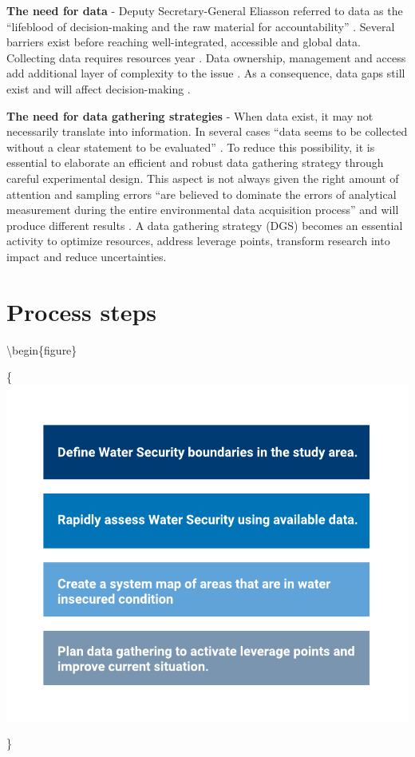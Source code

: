 \documentclass[
]{book}
\begin{document}
\textbf{The need for data} - Deputy Secretary-General Eliasson referred to data as the ``lifeblood of decision-making and the raw material for accountability'' \citep{UNWater2016}. Several barriers exist before reaching well-integrated, accessible and global data. Collecting data requires resources year \citep{Espey2015}. Data ownership, management and access add additional layer of complexity to the issue \citep{Hering2017}. As a consequence, data gaps still exist \citep{Schmidt-Traub2017b, UNwater2019} and will affect decision-making \citep{York2020Measuring}.

\textbf{The need for data gathering strategies} - When data exist, it may not necessarily translate into information. In several cases ``data seems to be collected without a clear statement to be evaluated'' \citep{Rose1992}. To reduce this possibility, it is essential to elaborate an efficient and robust data gathering strategy through careful experimental design. This aspect is not always given the right amount of attention and sampling errors ``are believed to dominate the errors of analytical measurement during the entire environmental data acquisition process'' \citep{Zhang2012} and will produce different results \citep{Abbatangelo2019, Wang2015a}. A data gathering strategy (DGS) becomes an essential activity to optimize resources, address leverage points, transform research into impact and reduce uncertainties.

\hypertarget{process-steps}{%
\section{Process steps}\label{process-steps}}

\textbackslash begin\{figure\}

\{\centering \includegraphics[width=0.6\linewidth]{images/WSCOAT_process}

\}
\end{document}
